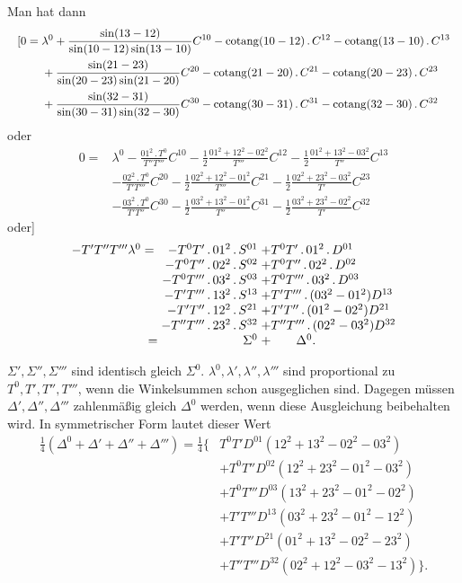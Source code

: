 Man hat dann
\[
\resizebox{\linewidth}{!}{\(\begin{aligned}
 {[}0={}&\lambda^0+\frac{\sin(13-12)}{\sin(10-12)\sin(13-10)}C^{10}
 -\operatorname{cotang}(10-12)\,.\,C^{12}
 -\operatorname{cotang}(13-10)\,.\,C^{13}\\
 &+\frac{\sin(21-23)}{\sin(20-23)\sin(21-20)}C^{20}
 -\operatorname{cotang}(21-20)\,.\,C^{21}
 -\operatorname{cotang}(20-23)\,.\,C^{23}\\
 &+\frac{\sin(32-31)}{\sin(30-31)\sin(32-30)}C^{30}
 -\operatorname{cotang}(30-31)\,.\,C^{31}
 -\operatorname{cotang}(32-30)\,.\,C^{32}
\end{aligned}\)}
\]
\noindent oder
\[
\begin{aligned}
 0={}&\lambda^0-\frac{01^2\,.\,T^0}{T''T'''}C^{10}
 -\tfrac12\frac{01^2+12^2-02^2}{T'''}C^{12}
 -\tfrac12\frac{01^2+13^2-03^2}{T''}C^{13}\\
 &-\frac{02^2\,.\,T^0}{T'T'''}C^{20}
 -\tfrac12\frac{02^2+12^2-01^2}{T'''}C^{21}
 -\tfrac12\frac{02^2+23^2-03^2}{T'}C^{23}\\
 &-\frac{03^2\,.\,T^0}{T'T''}C^{30}
 -\tfrac12\frac{03^2+13^2-01^2}{T''}C^{31}
 -\tfrac12\frac{03^2+23^2-02^2}{T'}C^{32}
\end{aligned}
\]
\noindent oder]
\[
\begin{array}{@{}r@{\;}r@{\;}l@{}}
 -T'T''T'''\lambda^0={}&-T^0T'\,.\,01^2\,.\,S^{01}&+T^0T'\,.\,01^2\,.\,D^{01}\\
 &-T^0T''\,.\,02^2\,.\,S^{02}&+T^0T''\,.\,02^2\,.\,D^{02}\\
 &-T^0T'''\,.\,03^2\,.\,S^{03}&+T^0T'''\,.\,03^2\,.\,D^{03}\\
 &-T'T'''\,.\,13^2\,.\,S^{13}&+T'T'''\,.\,(03^2-01^2)D^{13}\\
 &-T'T''\,.\,12^2\,.\,S^{21}&+T'T''\,.\,(01^2-02^2)D^{21}\\
 &-T''T'''\,.\,23^2\,.\,S^{32}&+T''T'''\,.\,(02^2-03^2)D^{32}\\
 =&\Sigma^0&+\qquad\Delta^0.
\end{array}
\]

\(\Sigma',\Sigma'',\Sigma'''\) sind identisch gleich \(\Sigma^0\). \(\lambda^0,\lambda',\lambda'',\lambda'''\) sind proportional zu \(T^0,T',T'',T'''\), wenn die Winkelsummen schon ausgeglichen sind. Dagegen müssen \(\Delta',\Delta'',\Delta'''\) zahlenmäßig gleich \(\Delta^0\) werden, wenn diese Ausgleichung beibehalten wird. In symmetrischer Form lautet dieser Wert
\[
\begin{aligned}
 \tfrac14(\Delta^0+\Delta'+\Delta''+\Delta''')=\tfrac14\bigl\{&
 T^0T'D^{01}(12^2+13^2-02^2-03^2)\\
 &+T^0T''D^{02}(12^2+23^2-01^2-03^2)\\
 &+T^0T'''D^{03}(13^2+23^2-01^2-02^2)\\
 &+T'T'''D^{13}(03^2+23^2-01^2-12^2)\\
 &+T'T''D^{21}(01^2+13^2-02^2-23^2)\\
 &+T''T'''D^{32}(02^2+12^2-03^2-13^2)\bigr\}.
\end{aligned}
\]

